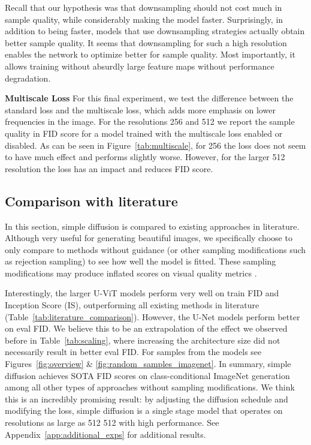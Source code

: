 \documentclass[nohyperref]{article}
\theoremstyle{plain}
\theoremstyle{definition}
\theoremstyle{remark}
\begin{document}
Recall that our hypothesis was that downsampling should not cost much in sample quality, while considerably making the model faster. Surprisingly, in addition to being faster, models that use downsampling strategies actually obtain better sample quality. It seems that downsampling for such a high resolution enables the network to optimize better for sample quality. Most importantly, it allows training without absurdly large feature maps without performance degradation.

\textbf{Multiscale Loss}
For this final experiment, we test the difference between the standard loss and the multiscale loss, which adds more emphasis on lower frequencies in the image. For the resolutions 256 and 512 we report the sample quality in FID score for a model trained with the multiscale loss enabled or disabled. As can be seen in Figure~\ref{tab:multiscale}, for 256 the loss does not seem to have much effect and performs slightly worse. However, for the larger 512 resolution the loss has an impact and reduces FID score. 


\subsection{Comparison with literature}
In this section, simple diffusion is compared to existing approaches in literature. Although very useful for generating beautiful images, we specifically choose to only compare to methods without guidance (or other sampling modifications such as rejection sampling) to see how well the model is fitted. These sampling modifications may produce inflated scores on visual quality metrics \citep{ho2022classifierfreeguidance}.

Interestingly, the larger U-ViT models perform very well on train FID and Inception Score (IS), outperforming all existing methods in literature (Table~\ref{tab:literature_comparison}). However, the U-Net models perform better on eval FID. We believe this to be an extrapolation of the effect we observed before in Table~\ref{tab:scaling}, where increasing the architecture size did not necessarily result in better eval FID. For samples from the models see Figures~\ref{fig:overview} \& \ref{fig:random_samples_imagenet}.
In summary, simple diffusion achieves SOTA FID scores on class-conditional ImageNet generation among all other types of approaches without sampling modifications. We think this is an incredibly promising result: by adjusting the diffusion schedule and modifying the loss, simple diffusion is a single stage model that operates on resolutions as large as 512  512 with high performance. See Appendix~\ref{app:additional_exps} for additional results.
\end{document}
